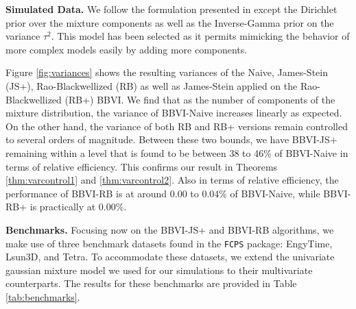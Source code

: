 \documentclass{article}
\begin{document}
\textbf{Simulated Data.} We follow the formulation presented in \cite{Bishop-2006} except the Dirichlet prior over the mixture components as well as the Inverse-Gamma prior on the variance $\tau^2$. This model has been selected as it permits mimicking the behavior of more complex models easily by adding more components.

Figure \ref{fig:variances} shows the resulting variances of the Naive, James-Stein (JS+), Rao-Blackwellized (RB) as well as James-Stein applied on the Rao-Blackwellized (RB+) BBVI. We find that as the number of components of the mixture distribution, the variance of BBVI-Naive increases linearly as expected. On the other hand, the variance of both RB and RB+ versions remain controlled to several orders of magnitude. Between these two bounds, we have BBVI-JS+ remaining within a level that is found to be between 38 to 46\% of BBVI-Naive in terms of relative efficiency. This confirms our result in Theorems \ref{thm:varcontrol1} and \ref{thm:varcontrol2}. Also in terms of relative efficiency, the performance of BBVI-RB is at around 0.00 to 0.04\% of BBVI-Naive, while BBVI-RB+ is practically at 0.00\%.

\textbf{Benchmarks.} Focusing now on the BBVI-JS+ and BBVI-RB algorithms, we make use of three benchmark datasets found in the \texttt{FCPS} \cite{FCPS} package: EngyTime, Lsun3D, and Tetra. To accommodate these datasets, we extend the univariate gaussian mixture model we used for our simulations to their multivariate counterparts. The results for these benchmarks are provided in Table \ref{tab:benchmarks}.
\end{document}
